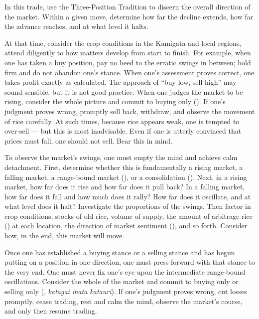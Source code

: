\begin{sokyubox}
{\small\itshape\color{sokyubar} }

\medskip
In this trade, use the Three-Position Tradition to discern the overall
direction of the market. Within a given move, determine how far the
decline extends, how far the advance reaches, and at what level it halts.

At that time, consider the crop conditions in the Kamigata and local
regions, attend diligently to how matters develop from start to finish.
For example, when one has taken a buy position, pay no heed to the
erratic swings in between; hold firm and do not abandon one's stance.
When one's assessment proves correct, one takes profit exactly as
calculated. The approach of ``buy low, sell high'' may sound sensible,
but it is not good practice. When one judges the market to be rising,
consider the whole picture and commit to buying only ().
If one's judgment proves wrong, promptly sell back, withdraw, and observe
the movement of rice carefully. At such times, because rice appears weak,
one is tempted to over-sell --- but this is most inadvisable. Even if one
is utterly convinced that prices must fall, one should not sell. Bear
this in mind.
\end{sokyubox}

\commentary
To observe the market's swings, one must empty the mind and achieve calm
detachment. First, determine whether this is fundamentally a rising
market, a falling market, a range-bound market (), or a consolidation (). Next, in a rising
market, how far does it rise and how far does it pull back? In a falling
market, how far does it fall and how much does it rally? How far does it
oscillate, and at what level does it halt? Investigate the proportions of
the swings. Then factor in crop conditions, stocks of old rice, volume of
supply, the amount of arbitrage rice () at each
location, the direction of market sentiment (), and so
forth. Consider how, in the end, this market will move.

Once one has established a buying stance or a selling stance and has
begun putting on a position in one direction, one must press forward with
that stance to the very end. One must never fix one's eye upon the
intermediate range-bound oscillations. Consider the whole of the market
and commit to buying only or selling only (,
\textit{katagai mata katauri}). If one's judgment proves wrong, cut
losses promptly, cease trading, rest and calm the mind, observe the
market's course, and only then resume trading.

